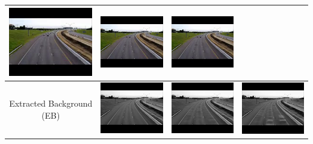 \documentclass[11pt]{scrartcl} %
\theoremstyle{plain}
\begin{document}
\begin{minipage}{\linewidth}
\begin{tabular}{ | c | m{2.8cm} | m{2.8cm} | m{2.8cm} | }
\begin{minipage}{.3\textwidth}
      \includegraphics[width=\linewidth, width=25mm]{figures_video/traffic/background.png}
    \end{minipage}
	&
    \begin{minipage}{.3\textwidth}
      \includegraphics[width=\linewidth, width=25mm]{figures_video/traffic/background.png}
    \end{minipage}
    &
    \begin{minipage}{.3\textwidth}
      \includegraphics[width=\linewidth, width=25mm]{figures_video/traffic/background.png}
    \end{minipage}
	\\[5ex] \hline
	
	Extracted Background (EB)
	&
    \begin{minipage}{.3\textwidth}
      \includegraphics[width=\linewidth, width=25mm]{figures_video/traffic/rpca/lowRank_0.png}
    \end{minipage}	
	&
    \begin{minipage}{.3\textwidth}
      \includegraphics[width=\linewidth, width=25mm]{figures_video/traffic/pca/lowRank_0.png}
    \end{minipage}
	&
    \begin{minipage}{.3\textwidth}
      \includegraphics[width=\linewidth, width=25mm]{figures_video/traffic/pca2/lowRank_0.png}
    \end{minipage}
	\\[6ex] \hline
	

\end{tabular}
\end{minipage}
\end{document}
